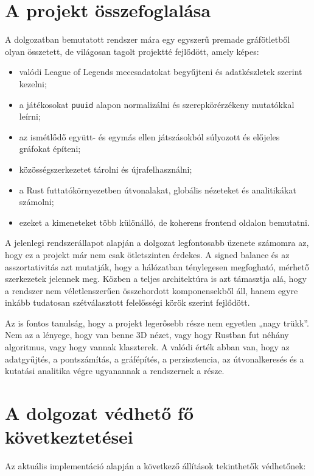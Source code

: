 \documentclass[a4paper,12pt]{report}
\begin{document}
\section{A projekt összefoglalása}

A dolgozatban bemutatott rendszer mára egy egyszerű premade gráfötletből olyan összetett, de világosan tagolt projektté fejlődött, amely képes:

\begin{itemize}
    \item valódi League of Legends meccsadatokat begyűjteni és adatkészletek szerint kezelni;
    \item a játékosokat \texttt{puuid} alapon normalizálni és szerepkörérzékeny mutatókkal leírni;
    \item az ismétlődő együtt- és egymás ellen játszásokból súlyozott és előjeles gráfokat építeni;
    \item közösségszerkezetet tárolni és újrafelhasználni;
    \item a Rust futtatókörnyezetben útvonalakat, globális nézeteket és analitikákat számolni;
    \item ezeket a kimeneteket több különálló, de koherens frontend oldalon bemutatni.
\end{itemize}

A jelenlegi rendszerállapot alapján a dolgozat legfontosabb üzenete számomra az, hogy ez a projekt már nem csak ötletszinten érdekes. A signed balance és az asszortativitás azt mutatják, hogy a hálózatban ténylegesen megfogható, mérhető szerkezetek jelennek meg. Közben a teljes architektúra is azt támasztja alá, hogy a rendszer nem véletlenszerűen összehordott komponensekből áll, hanem egyre inkább tudatosan szétválasztott felelősségi körök szerint fejlődött.

Az is fontos tanulság, hogy a projekt legerősebb része nem egyetlen „nagy trükk”. Nem az a lényege, hogy van benne 3D nézet, vagy hogy Rustban fut néhány algoritmus, vagy hogy vannak klaszterek. A valódi érték abban van, hogy az adatgyűjtés, a pontszámítás, a gráfépítés, a perzisztencia, az útvonalkeresés és a kutatási analitika végre ugyanannak a rendszernek a része.

\section{A dolgozat védhető fő következtetései}

Az aktuális implementáció alapján a következő állítások tekinthetők védhetőnek:
\end{document}
